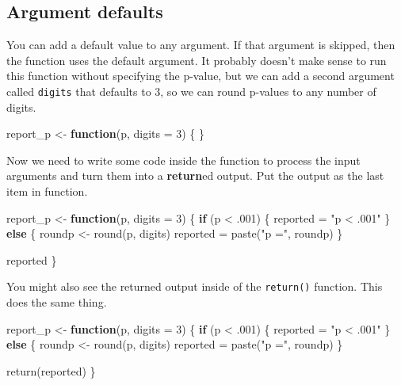 \documentclass[
  oneside]{book}
\newenvironment{Shaded}{\begin{snugshade}}{\end{snugshade}}
\newcommand{\AttributeTok}[1]{\textcolor[rgb]{0.77,0.63,0.00}{#1}}
\newcommand{\ControlFlowTok}[1]{\textcolor[rgb]{0.13,0.29,0.53}{\textbf{#1}}}
\newcommand{\DecValTok}[1]{\textcolor[rgb]{0.00,0.00,0.81}{#1}}
\newcommand{\FunctionTok}[1]{\textcolor[rgb]{0.00,0.00,0.00}{#1}}
\newcommand{\NormalTok}[1]{#1}
\newcommand{\OtherTok}[1]{\textcolor[rgb]{0.56,0.35,0.01}{#1}}
\newcommand{\SpecialCharTok}[1]{\textcolor[rgb]{0.00,0.00,0.00}{#1}}
\newcommand{\StringTok}[1]{\textcolor[rgb]{0.31,0.60,0.02}{#1}}
\begin{document}
\hypertarget{defaults}{%
\subsection{Argument defaults}\label{defaults}}

You can add a default value to any argument. If that argument is skipped, then the function uses the default argument. It probably doesn't make sense to run this function without specifying the p-value, but we can add a second argument called \texttt{digits} that defaults to 3, so we can round p-values to any number of digits.

\begin{Shaded}
\begin{Highlighting}[]
\NormalTok{report\_p }\OtherTok{\textless{}{-}} \ControlFlowTok{function}\NormalTok{(p, }\AttributeTok{digits =} \DecValTok{3}\NormalTok{) \{}
\NormalTok{\}}
\end{Highlighting}
\end{Shaded}

Now we need to write some code inside the function to process the input arguments and turn them into a \textbf{return}ed output. Put the output as the last item in function.

\begin{Shaded}
\begin{Highlighting}[]
\NormalTok{report\_p }\OtherTok{\textless{}{-}} \ControlFlowTok{function}\NormalTok{(p, }\AttributeTok{digits =} \DecValTok{3}\NormalTok{) \{}
  \ControlFlowTok{if}\NormalTok{ (p }\SpecialCharTok{\textless{}}\NormalTok{ .}\DecValTok{001}\NormalTok{) \{}
\NormalTok{    reported }\OtherTok{=} \StringTok{"p \textless{} .001"}
\NormalTok{  \} }\ControlFlowTok{else}\NormalTok{ \{}
\NormalTok{    roundp }\OtherTok{\textless{}{-}} \FunctionTok{round}\NormalTok{(p, digits)}
\NormalTok{    reported }\OtherTok{=} \FunctionTok{paste}\NormalTok{(}\StringTok{"p ="}\NormalTok{, roundp)}
\NormalTok{  \}}
  
\NormalTok{  reported}
\NormalTok{\}}
\end{Highlighting}
\end{Shaded}

You might also see the returned output inside of the \texttt{return()} function. This does the same thing.

\begin{Shaded}
\begin{Highlighting}[]
\NormalTok{report\_p }\OtherTok{\textless{}{-}} \ControlFlowTok{function}\NormalTok{(p, }\AttributeTok{digits =} \DecValTok{3}\NormalTok{) \{}
  \ControlFlowTok{if}\NormalTok{ (p }\SpecialCharTok{\textless{}}\NormalTok{ .}\DecValTok{001}\NormalTok{) \{}
\NormalTok{    reported }\OtherTok{=} \StringTok{"p \textless{} .001"}
\NormalTok{  \} }\ControlFlowTok{else}\NormalTok{ \{}
\NormalTok{    roundp }\OtherTok{\textless{}{-}} \FunctionTok{round}\NormalTok{(p, digits)}
\NormalTok{    reported }\OtherTok{=} \FunctionTok{paste}\NormalTok{(}\StringTok{"p ="}\NormalTok{, roundp)}
\NormalTok{  \}}
  
  \FunctionTok{return}\NormalTok{(reported)}
\NormalTok{\}}
\end{Highlighting}
\end{Shaded}
\end{document}
